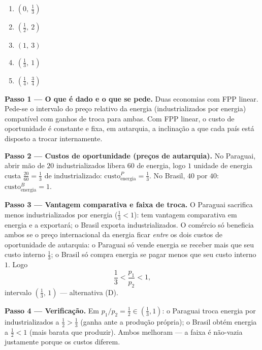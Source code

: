 \begin{enumerate}[label=\Alph*., leftmargin=3.2em, itemsep=0.15em, topsep=0.2em]
  \item $\left(0,\ \tfrac{1}{3}\right)$
  \item $\left(\tfrac{1}{2},\ 2\right)$
  \item $\left(1,\ 3\right)$
  \item $\left(\tfrac{1}{3},\ 1\right)$
  \item $\left(\tfrac{1}{4},\ \tfrac{3}{4}\right)$
\end{enumerate}
\begin{solucao}
\textbf{Passo 1 --- O que é dado e o que se pede.} Duas economias com FPP linear. Pede-se o intervalo do preço relativo da energia (industrializados por energia) compatível com ganhos de troca para ambas. Com FPP linear, o custo de oportunidade é constante e fixa, em autarquia, a inclinação a que cada país está disposto a trocar internamente.

\textbf{Passo 2 --- Custos de oportunidade (preços de autarquia).} No Paraguai, abrir mão de $20$ industrializados libera $60$ de energia, logo $1$ unidade de energia custa $\tfrac{20}{60}=\tfrac13$ de industrializado: $\text{custo}^{P}_{\text{energia}}=\tfrac13$. No Brasil, $40$ por $40$: $\text{custo}^{B}_{\text{energia}}=1$.

\textbf{Passo 3 --- Vantagem comparativa e faixa de troca.} O Paraguai sacrifica menos industrializados por energia ($\tfrac13<1$): tem vantagem comparativa em energia e a exportará; o Brasil exporta industrializados. O comércio só beneficia ambos se o preço internacional da energia ficar \emph{entre} os dois custos de oportunidade de autarquia: o Paraguai só vende energia se receber mais que seu custo interno $\tfrac13$; o Brasil só compra energia se pagar menos que seu custo interno $1$. Logo
\[ \frac{1}{3} < \frac{p_1}{p_2} < 1, \]
intervalo $\left(\tfrac13,\,1\right)$ --- alternativa (D).

\textbf{Passo 4 --- Verificação.} Em $p_1/p_2=\tfrac12\in(\tfrac13,1)$: o Paraguai troca energia por industrializados a $\tfrac12>\tfrac13$ (ganha ante a produção própria); o Brasil obtém energia a $\tfrac12<1$ (mais barata que produzir). Ambos melhoram --- a faixa é não-vazia justamente porque os custos diferem.


\end{solucao}
